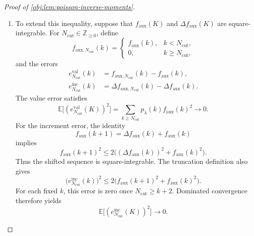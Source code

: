 \documentclass[11pt]{article}
\begin{document}
\begin{proof}[Proof of \cref{obj:lem:poisson-inverse-moments}]
\begin{enumerate}
\item To extend this inequality, suppose that \(f_{\mathrm{aux}}(K)\) and \(\Delta f_{\mathrm{aux}}(K)\) are square-integrable. For \(N_{\mathrm{cut}}\in\mathbb Z_{\ge0}\), define
\[
f_{\mathrm{aux},N_{\mathrm{cut}}}(k)
=
\begin{cases}
f_{\mathrm{aux}}(k),&k<N_{\mathrm{cut}},\\
0,&k\ge N_{\mathrm{cut}},
\end{cases}
\]
and the errors
\[
\begin{aligned}
e^{\mathrm{val}}_{N_{\mathrm{cut}}}(k)
&=f_{\mathrm{aux},N_{\mathrm{cut}}}(k)-f_{\mathrm{aux}}(k),\\
e^{\mathrm{inc}}_{N_{\mathrm{cut}}}(k)
&=\Delta f_{\mathrm{aux},N_{\mathrm{cut}}}(k)
  -\Delta f_{\mathrm{aux}}(k).
\end{aligned}
\]
The value error satisfies
\[
\mathbb E\bigl[(e^{\mathrm{val}}_{N_{\mathrm{cut}}}(K))^2\bigr]
=\sum_{k\ge N_{\mathrm{cut}}}p_\lambda(k)f_{\mathrm{aux}}(k)^2
\longrightarrow0.
\]
For the increment error, the identity
\[
f_{\mathrm{aux}}(k+1)
=\Delta f_{\mathrm{aux}}(k)+f_{\mathrm{aux}}(k)
\]
implies
\[
f_{\mathrm{aux}}(k+1)^2
\le2\bigl((\Delta f_{\mathrm{aux}}(k))^2+f_{\mathrm{aux}}(k)^2\bigr).
\]
Thus the shifted sequence is square-integrable. The truncation definition also gives
\[
\bigl(e^{\mathrm{inc}}_{N_{\mathrm{cut}}}(k)\bigr)^2
\le2\bigl(f_{\mathrm{aux}}(k+1)^2+f_{\mathrm{aux}}(k)^2\bigr).
\]
For each fixed \(k\), this error is zero once \(N_{\mathrm{cut}}\ge k+2\). Dominated convergence therefore yields
\[
\mathbb E\bigl[(e^{\mathrm{inc}}_{N_{\mathrm{cut}}}(K))^2\bigr]
\longrightarrow0.
\]


\end{enumerate}
\end{proof}
\end{document}
